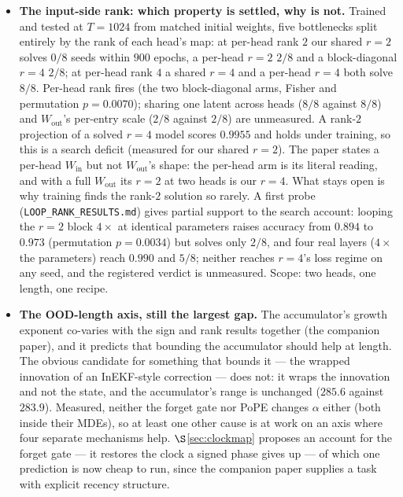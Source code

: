 \documentclass[11pt]{article}
\begin{document}
\begin{itemize}\itemsep3pt
\item \textbf{The input-side rank: which property is settled, why is not.} Trained and
  tested at $T=1024$ from matched initial weights, five bottlenecks split entirely by the
  rank of each head's map: at per-head rank $2$ our shared $r=2$ solves $0/8$ seeds within
  $900$ epochs, a per-head $r=2$ $2/8$ and a block-diagonal $r=4$ $2/8$; at per-head rank
  $4$ a shared $r=4$ and a per-head $r=4$ both solve $8/8$. Per-head rank fires (the two
  block-diagonal arms, Fisher and permutation $p=0.0070$); sharing one latent across heads
  ($8/8$ against $8/8$) and $W_{\mathrm{out}}$'s per-entry scale ($2/8$ against $2/8$) are
  unmeasured. A rank-$2$ projection of a solved $r=4$ model scores $0.9955$ and holds under
  training, so this is a search deficit (measured for our shared $r=2$). The paper states a
  per-head $W_{\mathrm{in}}$ but not $W_{\mathrm{out}}$'s shape: the per-head arm is its
  literal reading, and with a full $W_{\mathrm{out}}$ its $r=2$ at two heads is our $r=4$.
  What stays open is why training finds the rank-$2$ solution so rarely. A first probe
  (\texttt{LOOP\_RANK\_RESULTS.md}) gives partial support to the search account: looping the
  $r=2$ block $4\times$ at identical parameters raises accuracy from $0.894$ to $0.973$
  (permutation $p=0.0034$) but solves only $2/8$, and four real layers ($4\times$ the parameters)
  reach $0.990$ and $5/8$; neither reaches $r=4$'s loss regime on any seed, and the registered verdict is
  unmeasured. Scope: two heads, one length, one recipe.
\item \textbf{The OOD-length axis, still the largest gap.} The accumulator's growth
  exponent co-varies with the sign and rank results together (the companion paper),
  and it predicts that bounding the accumulator should help at length. The obvious
  candidate for something that bounds it --- the wrapped innovation of an
  InEKF-style correction --- does not: it wraps the innovation and not the state,
  and the accumulator's range is unchanged ($285.6$ against $283.9$). Measured,
  neither the forget gate nor PoPE changes $\alpha$ either (both inside their MDEs),
  so at least one other cause is at work on an axis where four separate mechanisms
  help. $\S$\ref{sec:clockmap} proposes an account for the forget gate --- it
  restores the clock a signed phase gives up --- of which one prediction is now
  cheap to run, since the companion paper supplies a task with explicit recency
  structure.


\end{itemize}
\end{document}
